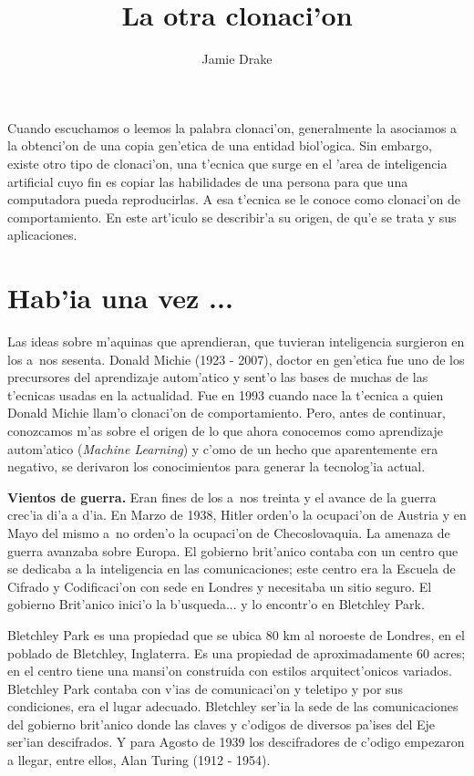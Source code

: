 \documentclass[11pt]{article}
\begin{document}
\title{La otra clonaci'on}
\author{Jamie Drake}

\maketitle
Cuando escuchamos o leemos la palabra clonaci'on, generalmente la asociamos a la obtenci'on de una copia gen'etica de una entidad biol'ogica. Sin embargo, existe otro tipo de clonaci'on, una t'ecnica que surge en el 'area de inteligencia artificial cuyo fin es copiar las habilidades de una persona para que una computadora pueda reproducirlas. A esa t'ecnica se le conoce como clonaci'on de comportamiento. En este art'iculo se describir'a su origen, de qu'e se trata y sus aplicaciones.


\section{Hab'ia una vez ...}
Las ideas sobre m'aquinas que aprendieran, que tuvieran inteligencia surgieron en los a~nos sesenta. Donald Michie (1923 - 2007), doctor en gen'etica fue uno de los precursores del aprendizaje autom'atico y sent'o las bases de muchas de las t'ecnicas usadas en la actualidad. Fue en 1993 cuando nace la t'ecnica a quien Donald Michie llam'o clonaci'on de comportamiento. Pero, antes de continuar, conozcamos m'as sobre el origen de lo que ahora conocemos como aprendizaje autom'atico (\textit{Machine Learning}) y c'omo de un hecho que aparentemente era negativo, se derivaron los conocimientos para generar la tecnolog'ia actual.


\medskip
\textbf{Vientos de guerra.} Eran fines de los a~nos treinta y el avance de la guerra crec'ia di'a a d'ia. En Marzo de 1938, Hitler orden'o la ocupaci'on de Austria y en Mayo del mismo a~no orden'o la ocupaci'on de Checoslovaquia. La amenaza de guerra avanzaba sobre Europa. El gobierno brit'anico contaba con un centro que se dedicaba a la inteligencia en las comunicaciones; este centro era la Escuela de Cifrado y Codificaci'on con sede en Londres y necesitaba un sitio seguro. El gobierno Brit'anico inici'o la b'usqueda... y lo encontr'o en Bletchley Park.

Bletchley Park es una propiedad que se ubica 80 km al noroeste de Londres, en el poblado de Bletchley, Inglaterra. Es una propiedad de aproximadamente 60 acres; en el centro tiene una mansi'on construida con estilos arquitect'onicos variados. Bletchley Park contaba con v'ias de comunicaci'on y teletipo y por sus condiciones, era el lugar adecuado. Bletchley ser'ia la sede de las comunicaciones del gobierno brit'anico donde las claves y c'odigos de diversos pa'ises del Eje ser'ian descifrados. Y para Agosto de 1939 los descifradores de c'odigo empezaron a llegar, entre ellos, Alan Turing (1912 - 1954). 
\end{document}
